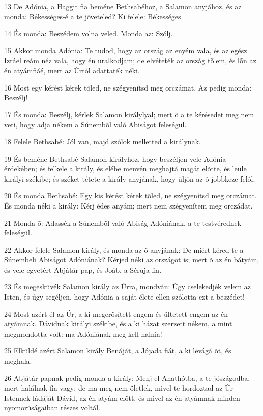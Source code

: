 \par 13 De Adónia, a Haggit fia beméne Bethsabéhoz, a Salamon anyjához, és az monda: Békességes-é a te jöveteled? Ki felele: Békességes.
\par 14 És monda: Beszédem volna veled. Monda az: Szólj.
\par 15 Akkor monda Adónia: Te tudod, hogy az ország az enyém vala, és az egész Izráel reám néz vala, hogy én uralkodjam; de elvéteték az ország tõlem, és lõn az én atyámfiáé, mert az Úrtól adattaték néki.
\par 16 Most egy kérést kérek tõled, ne szégyenítsd meg orczámat. Az pedig monda: Beszélj!
\par 17 És monda: Beszélj, kérlek Salamon királylyal; mert õ a te kérésedet meg nem veti, hogy adja nékem a Súnembõl való Abiságot feleségül.
\par 18 Felele Bethsabé: Jól van, majd szólok melletted a királynak.
\par 19 És beméne Bethsabé Salamon királyhoz, hogy beszéljen vele Adónia érdekében; és felkele a király, és elébe menvén meghajtá magát elõtte, és leüle királyi székibe; és széket tétete a király anyjának, hogy üljön az õ jobbkeze felõl.
\par 20 És monda Bethsabé: Egy kis kérést kérek tõled, ne szégyenítsd meg orczámat. És monda néki a király: Kérj édes anyám; mert nem szégyenítem meg orczádat.
\par 21 Monda õ: Adassék a Súnembõl való Abiság Adóniának, a te testvérednek feleségül.
\par 22 Akkor felele Salamon király, és monda az õ anyjának: De miért kéred te a Súnembeli Abiságot Adóniának? Kérjed néki az országot is; mert õ az én bátyám, és vele egyetért Abjátár pap, és Joáb, a Séruja fia.
\par 23 És megesküvék Salamon király az Úrra, mondván: Úgy cselekedjék velem az Isten, és úgy segéljen, hogy Adónia a saját élete ellen szólotta ezt a beszédet!
\par 24 Most azért él az Úr, a ki megerõsített engem és ültetett engem az én atyámnak, Dávidnak királyi székibe, és a ki házat szerzett nékem, a mint megmondotta volt: ma Adóniának meg kell halnia!
\par 25 Elküldé azért Salamon király Benáját, a Jójada fiát, a ki levágá õt, és meghala.
\par 26 Abjátár papnak pedig monda a király: Menj el Anathótba, a te jószágodba, mert halálnak fia vagy; de ma meg nem öletlek, mivel te hordoztad az Úr Istennek ládáját Dávid, az én atyám elõtt, és mivel az én atyámnak minden  nyomorúságaiban részes voltál.
